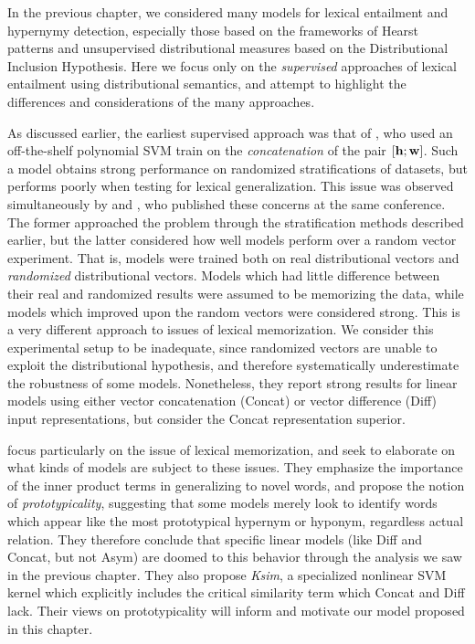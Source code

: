 In the previous chapter, we considered many models for lexical entailment and
hypernymy detection, especially those based on the frameworks of Hearst
patterns and unsupervised distributional measures based on the Distributional
Inclusion Hypothesis. Here we focus only on the {\em supervised} approaches of
lexical entailment using distributional semantics, and attempt to highlight
the differences and considerations of the many approaches.

As discussed earlier, the earliest supervised approach was that of
, who used an off-the-shelf polynomial SVM train on
the {\em concatenation} of the pair $[{\mathbf{h}}; {\mathbf{w}}]$. Such a model obtains strong
performance on randomized stratifications of datasets, but performs poorly
when testing for lexical generalization. This issue was observed simultaneously
by  and , who published
these concerns at the same conference. The former approached the problem
through the stratification methods described earlier, but the latter considered
how well models perform over a random vector experiment. That is, models were
trained both on real distributional vectors and {\em randomized} distributional
vectors. Models which had little difference between their real and randomized
results were assumed to be memorizing the data, while models which improved
upon the random vectors were considered strong. This is a very different
approach to issues of lexical memorization. We consider this experimental
setup to be inadequate, since randomized vectors are unable to exploit the
distributional hypothesis, and therefore systematically underestimate the
robustness of some models. Nonetheless, they report strong results for linear
models using either vector concatenation (Concat) or vector difference (Diff)
input representations, but consider the Concat representation superior.

 focus particularly on the issue of lexical
memorization, and seek to elaborate on what kinds of models are subject to
these issues. They emphasize the importance of the inner product terms in
generalizing to novel words, and propose the notion of {\em prototypicality},
suggesting that some models merely look to identify words which appear like the
most prototypical hypernym or hyponym, regardless actual relation. They
therefore conclude that specific linear models (like Diff and Concat, but not
Asym) are doomed to this behavior through the analysis we saw in the previous
chapter. They also propose {\em Ksim}, a specialized nonlinear SVM kernel which
explicitly includes the critical similarity term which Concat and Diff lack.
Their views on prototypicality will inform and motivate our model proposed in
this chapter.


